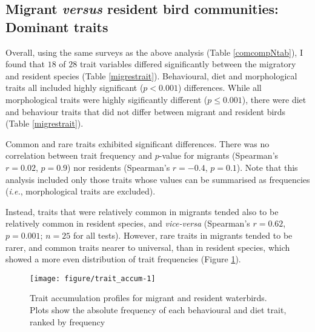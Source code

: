 \documentclass[12pt,a4paper]{article}\usepackage[]{graphicx}\usepackage[]{color}
\newenvironment{knitrout}{}{} %
\begin{document}
\clearpage
\subsection{Migrant \emph{versus} resident bird communities: Dominant traits}

Overall, using the same surveys as the above analysis (Table \ref{comcompNtab}), I found that $18$ of $28$ trait variables differed significantly between the migratory and resident species (Table \ref{migrestrait}). Behavioural, diet and morphological traits all included highly significant ($p < 0.001$) differences. While all morphological traits were highly sigificantly different ($p \leq 0.001$), there were diet and behaviour traits that did not differ between migrant and resident birds (Table \ref{migrestrait}). 



Common and rare traits exhibited significant differences. There was no correlation between trait frequency and $p$-value for migrants (Spearman's $r = 0.02$, $p = 0.9$) nor residents (Spearman's $r = \ensuremath{-0.4}$, $p = 0.1$). Note that this analysis included only those traits whose values can be summarised as frequencies (\emph{i.e.}, morphological traits are excluded). 

Instead, traits that were relatively common in migrants tended also to be relatively common in resident species, and \emph{vice-versa} (Spearman's $r = 0.62$, $p = 0.001$; $n=25$ for all tests). However, rare traits in migrants tended to be rarer, and common traits nearer to universal, than in resident species, which showed a more even distribution of trait frequencies (Figure \ref{fig:trait_accum}).

\begin{knitrout}
\color{fgcolor}\begin{figure}[bt]

{\centering \texttt{[image: figure/trait\_accum-1]} 

}

\caption[Trait accumulation profiles for migrant and resident waterbirds]{Trait accumulation profiles for migrant and resident waterbirds. Plots show the absolute frequency of each behavioural and diet trait, ranked by frequency}\label{fig:trait_accum}
\end{figure}


\end{knitrout}
\end{document}
